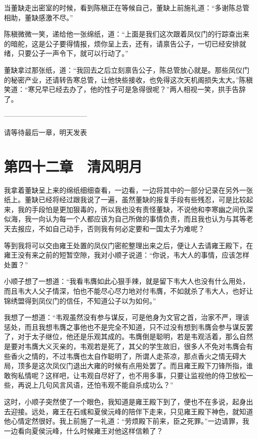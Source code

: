 当董缺走出密室的时候，看到陈稹正在等候自己，董缺上前施礼道：“多谢陈总管相助，董缺感激不尽。”

陈稹微微一笑，递给他一张绵纸，道：“上面是我们这次跟着凤仪门的行踪查出来的暗舵，这是公子要得情报，烦你呈上去，还有，请禀告公子，一切已经安排就绪，只要公子一声令下，就可以行动了。”

董缺拿过那张纸，道：“我回去之后立刻禀告公子，陈总管放心就是。那些凤仪门的秘密产业，还请转告寒总管，让他快些接收，也免得这次天机阁损失太大。”陈稹笑道：“寒兄早已经去办了，他的性子可是急得很呢？”两人相视一笑，拱手告辞了。

————————————

请等待最后一章，明天发表

\chapter{第四十二章　清风明月}

我拿着董缺呈上来的绵纸细细查看，一边看，一边将其中的一部分记录在另外一张纸上。董缺已经将经过跟我说了一遍，虽然董缺的报复手段有些残忍，可是比较起来，我的手段怕是更加狠毒的，所以我也没有责怪董缺，不说他和李寒幽之间仇深似海，我一向认为每一个人都应该为自己所做的事情负责，而且我也认为与其等老天去报应，不如自己动手，否则我有何必定要和一国太子为难呢？

等到我将可以交由雍王处置的凤仪门密舵整理出来之后，便让人去请雍王殿下，在雍王没有来之前的短暂空隙，我对小顺子说道：“你说，韦大人的事情，应该怎样处置？”

小顺子想了一想道：“我看韦膺如此心狠手辣，就是留下韦大人也没有什么用处，而且韦大人父子情深，怕也不能尽心尽力地对付韦膺，不如就杀了韦大人，也好让锦绣盟得到凤仪门的信任，不知道公子以为如何。”

我想了一想道：“韦观虽然没有参与谋反，可是他身为文官之首，治家不严，理该惩处，而且我想韦膺之事他也不是完全不知道，只不过没有想到韦膺会参与谋反罢了，对于太子继位，他还是乐观其成的。韦膺倒是聪明，若是韦观活着，那么自然是要对韦膺大义灭亲的，韦观若是死了，其父的学生故旧，很多人不免对韦膺会有些香火之情的，不过韦膺也太自作聪明了，所谓人走茶凉，那点香火之情无碍大局，顶多是这次凤仪门退出大雍的时候有点用处罢了。而且雍王殿下刀锋所指，谁敢徇私情呢？这样吧，让韦观自尽好了，也不用多事，只要让监视他的侍卫放松一些，再说上几句风言风语，还怕韦观不能自杀成功么？”

这时，小顺子突然使了一个眼色，我知道是雍王殿下到了，便也不在多说，起身出去迎接。远处，雍王在石彧和夏侯沅峰的陪伴下走来，只见雍王殿下神色，就知道他心情定然很好。我上前施了一礼道：“劳烦殿下前来，臣之死罪。”一边请罪，我一边看向夏侯沅峰，什么时候雍王对他这样信赖了？

